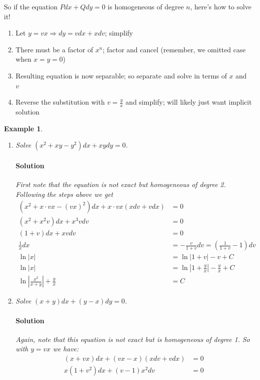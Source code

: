 \documentclass[letterpaper, 11pt, openany]{book}
\theoremstyle{mytheoremstyle}
\theoremstyle{myexamplestyle}
\newtheorem{example}{Example}[section]
\newenvironment{solution}{\paragraph{\sffamily \smaller \fontseries{b}\selectfont Solution}}{\hfill\faSquare}
\begin{document}
So if the equation \(P dx + Q dy = 0\) is homogeneous of degree \(n\), here's how to solve it!
\begin{enumerate}[leftmargin=0.75in]
    \item Let \(y = vx \Rightarrow dy = v dx + x dv\); simplify
    \item There must be a factor of \(x^{n}\); factor and cancel (remember, we omitted case when \(x=y=0\))
    \item Resulting equation is now separable; so separate and solve in terms of \(x\) and \(v\)
    \item Reverse the substitution with \(v = \frac{y}{x}\) and simplify; will likely just want implicit solution
\end{enumerate}

\begin{example}\label{e:de-homogeneous-deg-n-eqns}
    \begin{enumerate}
        \item Solve \((x^{2} + xy -y^{2})dx + xy dy = 0\).
        \begin{solution}
            First note that the equation is not exact but homogeneous of degree 2. Following the steps above we get
            \begin{align*}
                \left(x^{2} + x\cdot vx -(vx)^{2}\right)dx + x\cdot vx (x dv + v dx) &= 0\\
                (x^{2} + x^{2}v)dx + x^{3}v dv &= 0\\
                (1+v)dx + xv dv &=0\\
                \frac{1}{x}dx &= -\frac{v}{1+v}dv = \left(\frac{1}{1+v} - 1\right) dv\\
                \ln|x| &= \ln |1+v| - v + C\\
                \ln|x| &= \ln\left|1 + \frac{y}{x}\right| - \frac{y}{x} + C\\
                \ln|\frac{x^{2}}{x + y}| + \frac{y}{x} &= C
            \end{align*}
        \end{solution}
        \item Solve \((x+y)dx + (y-x)dy=0\).
        \begin{solution}
            Again, note that this equation is not exact but is homogeneous of degree 1. So with \(y=vx\) we have:
            \begin{align*}
                (x+vx)dx + (vx-x)(x dv + v dx) &= 0\\
                x(1+v^{2})dx + (v-1)x^{2}dv &= 0\\

\end{align*}
\end{solution}
\end{enumerate}
\end{example}
\end{document}
